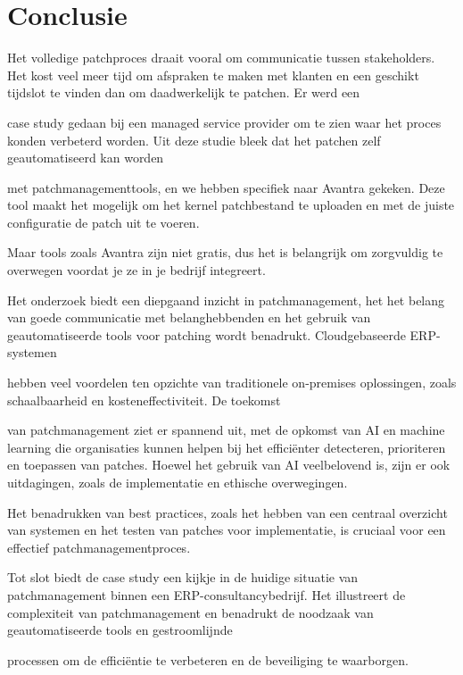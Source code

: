 
\chapter{Conclusie}%
\label{ch:conclusie}


Het volledige patchproces draait vooral om communicatie tussen stakeholders. Het kost veel meer tijd om afspraken te maken met klanten en een geschikt tijdslot te vinden dan om daadwerkelijk te patchen. Er werd een 

case study gedaan bij een managed service provider om te zien waar het proces konden verbeterd worden. Uit deze studie bleek dat het patchen zelf geautomatiseerd kan worden

met patchmanagementtools, en we hebben specifiek naar Avantra gekeken. Deze tool maakt het mogelijk om het kernel patchbestand te uploaden en met de juiste configuratie de patch uit te voeren.

Maar tools zoals Avantra zijn niet gratis, dus het is belangrijk om zorgvuldig te overwegen voordat je ze in je bedrijf integreert.

Het onderzoek biedt een diepgaand inzicht in patchmanagement, het het belang van goede communicatie met belanghebbenden en het gebruik van geautomatiseerde tools voor patching wordt benadrukt. Cloudgebaseerde ERP-systemen 

hebben veel voordelen ten opzichte van traditionele on-premises oplossingen, zoals schaalbaarheid en kosteneffectiviteit. De toekomst

van patchmanagement ziet er spannend uit, met de opkomst van AI en machine learning die organisaties kunnen helpen bij het efficiënter detecteren, prioriteren en toepassen van patches. Hoewel het gebruik van AI veelbelovend is, zijn er ook uitdagingen, zoals de implementatie en ethische overwegingen.

Het benadrukken van best practices, zoals het hebben van een centraal overzicht van systemen en het testen van patches voor implementatie, is cruciaal voor een effectief patchmanagementproces.

Tot slot biedt de case study een kijkje in de huidige situatie van patchmanagement binnen een ERP-consultancybedrijf. Het illustreert de complexiteit van patchmanagement en benadrukt de noodzaak van geautomatiseerde tools en gestroomlijnde 

processen om de efficiëntie te verbeteren en de beveiliging te waarborgen.